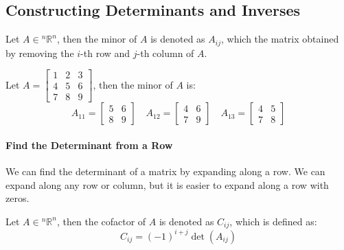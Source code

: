 \documentclass[11pt]{report}
\begin{document}
\subsection{Constructing Determinants and Inverses}
\begin{definition}
    Let $A \in {^n\mathbb{R}^n}$, then the minor of $A$ is denoted as $A_{ij}$, which the matrix obtained by removing the $i$-th row and $j$-th column of $A$.
\end{definition}
\begin{example}
    Let $A = \begin{bmatrix} 1 & 2 & 3 \\ 4 & 5 & 6 \\ 7 & 8 & 9 \end{bmatrix}$, then the minor of $A$ is:
    $$ A_{11} = \begin{bmatrix} 5 & 6 \\ 8 & 9 \end{bmatrix} \quad A_{12} = \begin{bmatrix} 4 & 6 \\ 7 & 9 \end{bmatrix} \quad A_{13} = \begin{bmatrix} 4 & 5 \\ 7 & 8 \end{bmatrix} $$
\end{example}
\paragraph{Find the Determinant from a Row} We can find the determinant of a matrix by expanding along a row. We can expand along any row or column, but it is easier to expand along a row with zeros.
\begin{definition}[Cofactor]
    Let $A \in  {^n\mathbb{R}^n}$, then the cofactor of $A$ is denoted as $C_{ij}$, which is defined as:
    \begin{equation}
        C_{ij} = (-1)^{i+j}\det(A_{ij})
    \end{equation}
\end{definition}
\end{document}
